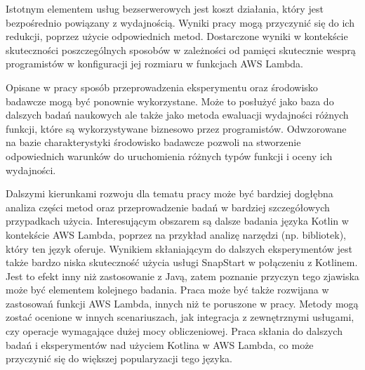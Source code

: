 Istotnym elementem usług bezserwerowych jest koszt działania, który jest bezpośrednio powiązany z wydajnością.
Wyniki pracy mogą przyczynić się do ich redukcji, poprzez użycie odpowiednich metod.
Dostarczone wyniki w kontekście skuteczności poszczególnych sposobów w zależności od pamięci skutecznie wesprą programistów w konfiguracji jej rozmiaru w funkcjach AWS Lambda.

Opisane w pracy sposób przeprowadzenia eksperymentu oraz środowisko badawcze mogą być ponownie wykorzystane.
Może to posłużyć jako baza do dalszych badań naukowych ale także jako metoda ewaluacji wydajności różnych funkcji, które są wykorzystywane biznesowo przez programistów.
Odwzorowane na bazie charakterystyki środowisko badawcze pozwoli na stworzenie odpowiednich warunków do uruchomienia różnych typów funkcji i oceny ich wydajności.

Dalszymi kierunkami rozwoju dla tematu pracy może być bardziej dogłębna analiza części metod oraz przeprowadzenie badań w bardziej szczegółowych przypadkach użycia.
Interesującym obszarem są dalsze badania języka Kotlin w kontekście AWS Lambda, poprzez na przykład analizę narzędzi (np. bibliotek), który ten język oferuje.
Wynikiem skłaniającym do dalszych eksperymentów jest także bardzo niska skuteczność użycia usługi SnapStart w połączeniu z Kotlinem.
Jest to efekt inny niż zastosowanie z Javą, zatem poznanie przyczyn tego zjawiska może być elementem kolejnego badania.
Praca może być także rozwijana w zastosowań funkcji AWS Lambda, innych niż te poruszone w pracy.
Metody mogą zostać ocenione w innych scenariuszach, jak integracja z zewnętrznymi usługami, czy operacje wymagające dużej mocy obliczeniowej.
Praca skłania do dalszych badań i eksperymentów nad użyciem Kotlina w AWS Lambda, co może przyczynić się do większej popularyzacji tego języka.
